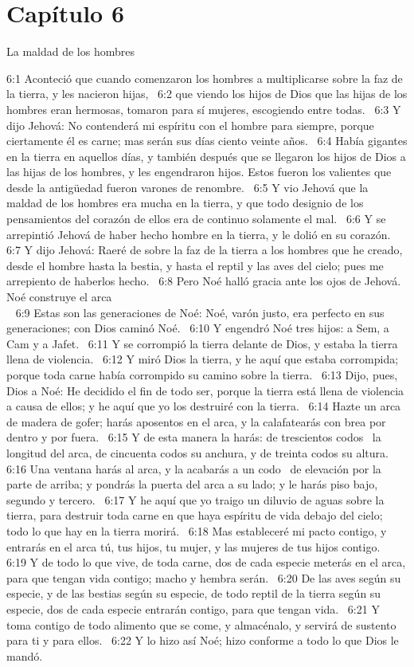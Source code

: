 \section*{Capítulo 6}
La maldad de los hombres  

6:1 Aconteció que cuando comenzaron los hombres a multiplicarse sobre la faz de la tierra, y les nacieron hijas,  
6:2 que viendo los hijos de Dios que las hijas de los hombres eran hermosas, tomaron para sí mujeres, escogiendo entre todas.  
6:3 Y dijo Jehová: No contenderá mi espíritu con el hombre para siempre, porque ciertamente él es carne; mas serán sus días ciento veinte años.  
6:4 Había gigantes en la tierra en aquellos días, y también después que se llegaron los hijos de Dios a las hijas de los hombres, y les engendraron hijos. Estos fueron los valientes que desde la antigüedad fueron varones de renombre.  
6:5 Y vio Jehová que la maldad de los hombres era mucha en la tierra, y que todo designio de los pensamientos del corazón de ellos era de continuo solamente el mal.  
6:6 Y se arrepintió Jehová de haber hecho hombre en la tierra, y le dolió en su corazón.  
6:7 Y dijo Jehová: Raeré de sobre la faz de la tierra a los hombres que he creado, desde el hombre hasta la bestia, y hasta el reptil y las aves del cielo; pues me arrepiento de haberlos hecho.  
6:8 Pero Noé halló gracia ante los ojos de Jehová. \\

 
Noé construye el arca\\
  
6:9 Estas son las generaciones de Noé: Noé, varón justo, era perfecto en sus generaciones; con Dios caminó Noé.  
6:10 Y engendró Noé tres hijos: a Sem, a Cam y a Jafet.  
6:11 Y se corrompió la tierra delante de Dios, y estaba la tierra llena de violencia.  
6:12 Y miró Dios la tierra, y he aquí que estaba corrompida; porque toda carne había corrompido su camino sobre la tierra.  
6:13 Dijo, pues, Dios a Noé: He decidido el fin de todo ser, porque la tierra está llena de violencia a causa de ellos; y he aquí que yo los destruiré con la tierra.  
6:14 Hazte un arca de madera de gofer; harás aposentos en el arca, y la calafatearás con brea por dentro y por fuera.  
6:15 Y de esta manera la harás: de trescientos codos  la longitud del arca, de cincuenta codos su anchura, y de treinta codos su altura.  
6:16 Una ventana harás al arca, y la acabarás a un codo  de elevación por la parte de arriba; y pondrás la puerta del arca a su lado; y le harás piso bajo, segundo y tercero.  
6:17 Y he aquí que yo traigo un diluvio de aguas sobre la tierra, para destruir toda carne en que haya espíritu de vida debajo del cielo; todo lo que hay en la tierra morirá.  
6:18 Mas estableceré mi pacto contigo, y entrarás en el arca tú, tus hijos, tu mujer, y las mujeres de tus hijos contigo.  
6:19 Y de todo lo que vive, de toda carne, dos de cada especie meterás en el arca, para que tengan vida contigo; macho y hembra serán.  
6:20 De las aves según su especie, y de las bestias según su especie, de todo reptil de la tierra según su especie, dos de cada especie entrarán contigo, para que tengan vida.  
6:21 Y toma contigo de todo alimento que se come, y almacénalo, y servirá de sustento para ti y para ellos.  
6:22 Y lo hizo así Noé; hizo conforme a todo lo que Dios le mandó.  
